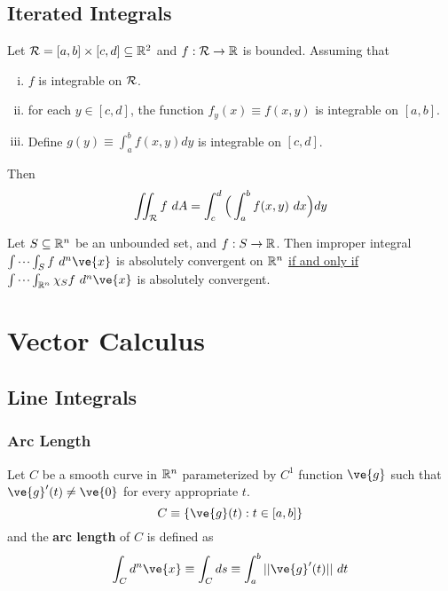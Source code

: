 \documentclass[11pt]{article}
\begin{document}
		\subsection{Iterated Integrals}
			\begin{theorem}
				Let $\mathcal{{R}} = [a,b] \times [c,d] \subseteq \mathbb{R}^2$ and $f: \mathcal{{R}} \to \mathbb{R}$ is bounded. Assuming that
				\begin{enumerate}[(i)]
					\item $f$ is integrable on $\mathcal{{R}}$.
					\item for each $y \in [c,d]$, the function $f_y(x) \equiv f(x,y)$ is integrable on $[a,b]$.
					\item Define $g(y) \equiv \int_a^b f(x, y) dy$ is integrable on $[c,d]$.
				\end{enumerate}
				Then 
				\begin{equation}
					\iint_{\mathcal{{R}}} f\ dA = \int_c^d \Big ( \int_a^b f(x,y)\ dx\Big)dy
				\end{equation}
			\end{theorem}
		
		\begin{proposition}
			Let $S \subseteq \mathbb{R}^n$ be an unbounded set, and $f: S \to \mathbb{R}$.
			Then improper integral $\idotsint_{S} f\ d^n \ve{x}$ is absolutely convergent on $\mathbb{R}^n$ \ul{if and only if} $\idotsint_{\R^n} \chi_S f\ d^n \ve{x}$ is absolutely convergent.
		\end{proposition}
	
	
	\section{Vector Calculus}
		\subsection{Line Integrals}
		\subsubsection{Arc Length}
			\begin{definition}
				Let $C$ be a smooth curve in $\mathbb{R}^n$ parameterized by $C^1$ function $\ve{g}$ such that $\ve{g}'(t) \neq \ve{0}$ for every appropriate $t$.
				\begin{equation}
					C \equiv \{\ve{g}(t): t \in [a, b]\}
				\end{equation}
				and the \textbf{arc length} of $C$ is defined as
				\begin{gather}
					\int_C d^n\ve{x} \equiv \int_C ds \equiv \int_a^b ||\ve{g}'(t)||\ dt
				\end{gather}
			\end{definition}
			
\end{document}
